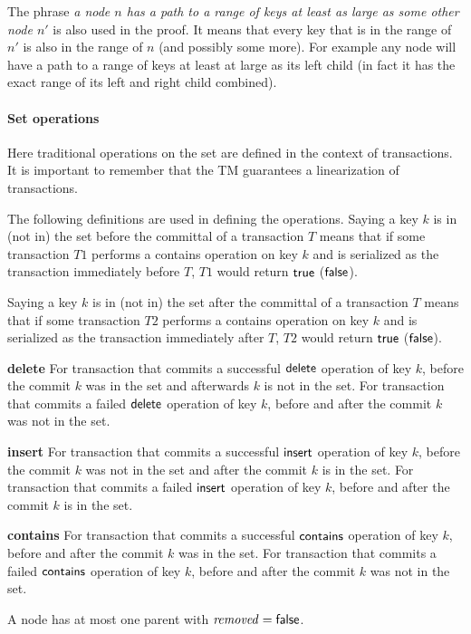 The phrase \emph{a node $n$ has a path to a range of keys at least as large as some other node $n'$} is also used in the proof.
It means that every key that is in the range of
$n'$ is also in the range of $n$ (and possibly some more).
For example any node will have a path to a range of keys at least at large as its left child (in fact it has the exact range of its left and right child combined).

\paragraph{Set operations}
Here traditional operations on the set are defined in the context of transactions.
It is important to remember that the TM guarantees a linearization of transactions.

The following definitions are used in defining the operations.
Saying a key $k$ is in (not in) the set before the committal of a transaction $T$ means that if some transaction $T1$ performs a contains operation on key $k$
and is serialized as the transaction immediately before $T$, $T1$ would return $\lit{true}$ ($\lit{false}$).

Saying a key $k$ is in (not in) the set after the committal of a transaction $T$ means that if some transaction $T2$ performs a contains operation on key $k$
and is serialized as the transaction immediately after $T$, $T2$ would return $\lit{true}$ ($\lit{false}$).

{\bf delete} For transaction that commits a successful $\act{delete}$ operation of key $k$, before the commit $k$ was in the set
and afterwards $k$ is not in the set.
For transaction that commits a failed $\act{delete}$ operation of key $k$, before and after the commit $k$ was not in the set.

{\bf insert} For transaction that commits a successful $\act{insert}$ operation of key $k$, before the commit $k$ was not in the set and after the commit $k$ is in the set.
For transaction that commits a failed $\act{insert}$ operation of key $k$, before and after the commit $k$ is in the set.

{\bf contains} For transaction that commits a successful $\act{contains}$ operation of key $k$, before and after the commit $k$ was in the set.
For transaction that commits a failed $\act{contains}$ operation of key $k$, before and after the commit $k$ was not in the set.


\begin{lemma}
\label{lemma:1-rem}
A node has at most one parent with $\ms{removed} = \lit{false}$.
\end{lemma}

